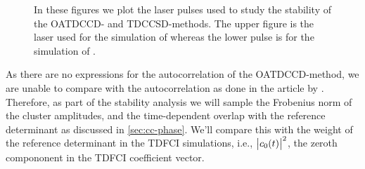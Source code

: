         \begin{figure}
            \centering
            \caption{In these figures we plot the laser pulses used to study the
            stability of the OATDCCD- and TDCCSD-methods.
            The upper figure is the laser used for the simulation of 
            whereas the lower pulse is for the simulation of .}
            \label{fig:stability-lasers}
        \end{figure}

        As there are no expressions for the autocorrelation of the
        OATDCCD-method, we are unable to compare with the autocorrelation as
        done in the article by \citeauthor{pedersen2018symplectic}.
        Therefore, as part of the stability analysis we will sample the
        Frobenius norm of the cluster amplitudes, and the time-dependent overlap
        with the reference determinant as discussed in \autoref{sec:cc-phase}.
        We'll compare this with the weight of the reference determinant in the
        TDFCI simulations, i.e., $\abs{c_0(t)}^2$, the zeroth compononent in the
        TDFCI coefficient vector.

